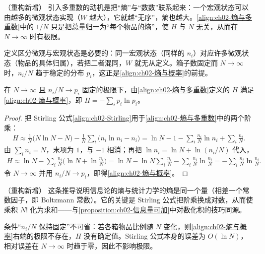 \documentclass[../../main.tex]{subfiles}
\begin{document}
\begin{remark}（重构新增）
引入多重数的动机是把“熵”与“数数”联系起来：一个宏观状态可以由越多的微观状态实现（$W$ 越大），它就越“无序”，熵也越大。\eqref{align:ch02-熵与多重数}中的 $1/N$ 只是把总量归一为“每个物品的熵”，使 $H$ 与 $N$ 无关，从而在 $N\to\infty$ 时有极限。

定义区分微观与宏观状态是必要的：同一宏观状态（同样的 $n_i$）对应许多微观状态（物品的具体归属），若把二者混同，$W$ 就无从定义。箱子数固定而 $N\to\infty$ 时，$n_i/N$ 趋于稳定的分布 $p_i$，这正是\eqref{align:ch02-熵与概率}的前提。
\end{remark}

\begin{proposition}[熵的统计力学表达式]\label{proposition:ch02-熵与多重数}
在 $N\to\infty$ 且 $n_i/N\to p_i$ 固定的极限下，由\eqref{align:ch02-熵与多重数}定义的 $H$ 满足\eqref{align:ch02-熵与概率}，即 $H=-\sum_ip_i\ln p_i$。
\end{proposition}

\begin{proof}
把 Stirling 公式\eqref{align:ch02-Stirling}用于\eqref{align:ch02-熵与多重数}中的两个阶乘：
\begin{align*}
  H \approx \frac{1}{N}\big(N\ln N - N\big) - \frac{1}{N}\sum_i\big(n_i\ln n_i - n_i\big)
  = \ln N - 1 - \sum_i\frac{n_i}{N}\ln n_i + \sum_i\frac{n_i}{N} .
\end{align*}
由 $\sum_in_i=N$，末项为 $1$，与 $-1$ 相消；再把 $\ln n_i=\ln N+\ln(n_i/N)$ 代入，
\begin{align*}
  H \approx \ln N - \sum_i\frac{n_i}{N}\Big(\ln N + \ln\frac{n_i}{N}\Big)
  = \ln N - \ln N\sum_i\frac{n_i}{N} - \sum_i\frac{n_i}{N}\ln\frac{n_i}{N}
  = -\sum_i\frac{n_i}{N}\ln\frac{n_i}{N} .
\end{align*}
令 $N\to\infty$ 并用 $n_i/N\to p_i$，即得\eqref{align:ch02-熵与概率}。
\end{proof}

\begin{remark}（重构新增）
这条推导说明信息论的熵与统计力学的熵是同一个量（相差一个常数因子，即 Boltzmann 常数）。它的关键是 Stirling 公式把阶乘换成对数，从而使乘积 $N!$ 化为求和——与\cref{proposition:ch02-信息量可加}中对数化积的技巧同源。

条件“$n_i/N$ 保持固定”不可省：若各箱物品比例随 $N$ 变化，则\eqref{align:ch02-熵与概率}右端的极限不存在，$H$ 没有确定值。Stirling 公式本身的误差为 $O(\ln N)$，相对误差在 $N\to\infty$ 时趋于零，因此不影响极限。
\end{remark}
\end{document}
